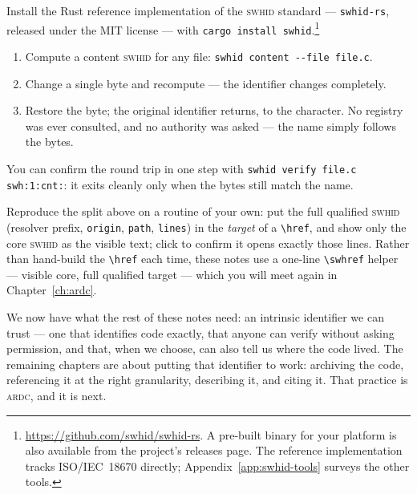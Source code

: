 \begin{handson}
Install the Rust reference implementation of the \textsc{swhid} standard --- \texttt{swhid-rs},
released under the MIT license --- with \texttt{cargo install swhid}.\footnote{\url{https://github.com/swhid/swhid-rs}.
A pre-built binary for your platform is also available from the project's releases page. The
reference implementation tracks ISO/IEC~18670 directly; Appendix~\ref{app:swhid-tools} surveys
the other tools.}
\begin{enumerate}[nosep,leftmargin=*]
  \item Compute a content \textsc{swhid} for any file: \texttt{swhid content -{}-file file.c}.
  \item Change a single byte and recompute --- the identifier changes completely.
  \item Restore the byte; the original identifier returns, to the character. No registry was ever
        consulted, and no authority was asked --- the name simply follows the bytes.
\end{enumerate}
You can confirm the round trip in one step with \texttt{swhid verify file.c swh:1:cnt:\textellipsis}:
it exits cleanly only when the bytes still match the name.
\end{handson}

\begin{handson}
Reproduce the split above on a routine of your own: put the full qualified \textsc{swhid}
(resolver prefix, \texttt{origin}, \texttt{path}, \texttt{lines}) in the \emph{target} of a
\texttt{\textbackslash href}, and show only the core \textsc{swhid} as the visible text; click to
confirm it opens exactly those lines. Rather than hand-build the \texttt{\textbackslash href} each
time, these notes use a one-line \texttt{\textbackslash swhref} helper --- visible core, full
qualified target --- which you will meet again in Chapter~\ref{ch:ardc}.
\end{handson}

\enlargethispage{2\baselineskip}
We now have what the rest of these notes need: an intrinsic identifier we can trust --- one that
identifies code exactly, that anyone can verify without asking permission, and that, when we choose,
can also tell us where the code lived. The remaining chapters are about putting that identifier to
work: archiving the
code, referencing it at the right granularity, describing it, and citing it. That practice is
\textsc{ardc}, and it is next.
